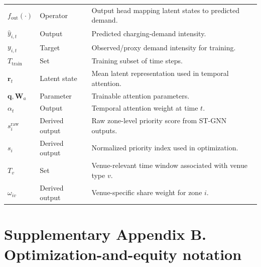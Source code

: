\documentclass[11pt]{article}
\begin{document}
\begin{table}[p]
\begin{threeparttable}
\begin{tabularx}{\textwidth}{Z Z Y}
$f_{\mathrm{out}}(\cdot)$ & Operator & Output head mapping latent states to predicted demand. \\
$\hat{y}_{i,t}$ & Output & Predicted charging-demand intensity. \\
$y_{i,t}$ & Target & Observed/proxy demand intensity for training. \\
$T_{\mathrm{train}}$ & Set & Training subset of time steps. \\
$\mathbf{r}_t$ & Latent state & Mean latent representation used in temporal attention. \\
$\mathbf{q},\mathbf{W}_a$ & Parameter & Trainable attention parameters. \\
$\alpha_t$ & Output & Temporal attention weight at time $t$. \\
$s_i^{\mathrm{raw}}$ & Derived output & Raw zone-level priority score from ST-GNN outputs. \\
$s_i$ & Derived output & Normalized priority index used in optimization. \\
$T_v$ & Set & Venue-relevant time window associated with venue type $v$. \\
$\omega_{iv}$ & Derived output & Venue-specific share weight for zone $i$. \\
\bottomrule
\end{tabularx}
\end{threeparttable}
\end{table}

\clearpage

\section*{Supplementary Appendix B. Optimization-and-equity notation}
\end{document}
